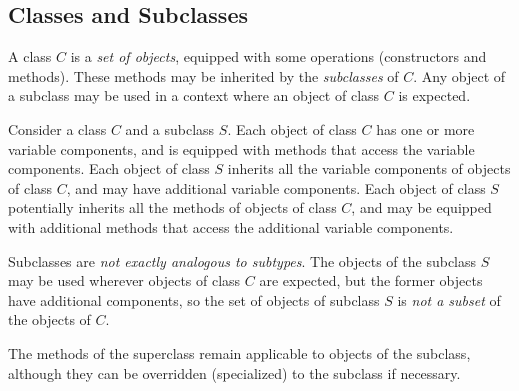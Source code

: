 \subsection{Classes and Subclasses}
\label{subsec:class-subclass}

A class $C$ is a \textit{set of objects}, equipped with some
operations (constructors and methods). These methods may be inherited by the \textit{subclasses} of $C$. Any object of a subclass may be used in a context where an object of class $C$ is expected.

Consider a class $C$ and a subclass $S$. Each object of class $C$ has one or more variable components, and is equipped with methods that access the variable components.  Each object of class $S$ inherits all the variable components of objects of class $C$, and may have additional variable components. Each object of class $S$ potentially inherits all the methods of objects of class $C$, and may be equipped with additional methods that access the additional variable components.

Subclasses are \textit{not exactly analogous to subtypes}. The objects of the subclass $S$ may be used wherever objects of class $C$ are expected, but the former objects have additional components, so the set of objects of subclass $S$ is \textit{not a subset} of the objects of $C$.

The methods of the superclass remain applicable to objects of the subclass, although they can be overridden (specialized) to the subclass if necessary. 
